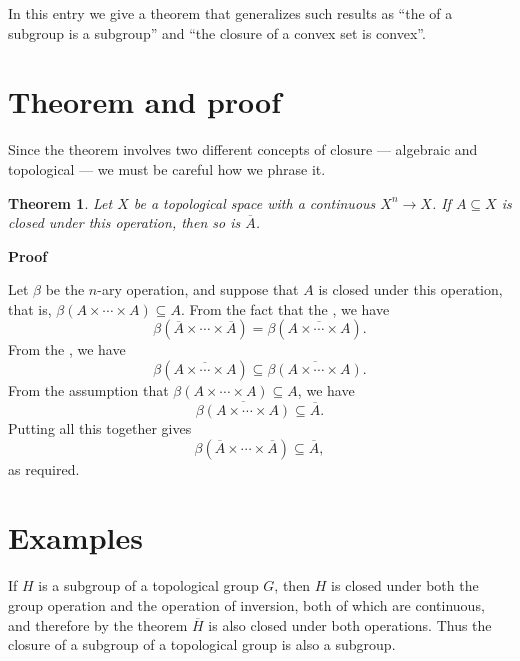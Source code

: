 \documentclass[12pt]{article}
\def\closure{\overline}
\newtheorem*{thm*}{Theorem}
\begin{document}

In this entry we give a theorem that generalizes such results as
``the  of a subgroup is a subgroup''
and ``the closure of a convex set is convex''.

\section*{Theorem and proof}

Since the theorem involves two different concepts of closure 
--- algebraic and topological --- we must be careful how we phrase it.

\begin{thm*}
Let $X$ be a topological space with a continuous
 $X^n\to X$.
If $A\subseteq X$ is closed under this operation,
then so is $\closure{A}$.
\end{thm*}

{\bf Proof}

Let $\beta$ be the $n$-ary operation,
and suppose that $A$ is closed under this operation,
that is, $\beta(A\times\cdots\times A)\subseteq A$.
From the fact that the 
,
we have
\[
  \beta(\closure{A}\times\cdots\times\closure{A}) =
  \beta(\closure{A\times\cdots\times A}).
\]
From the
,
we have
\[
  \beta(\closure{A\times\cdots\times A}) \subseteq
  \closure{\beta(A\times\cdots\times A)}.
\]
From the assumption that $\beta(A\times\cdots\times A)\subseteq A$,
we have
\[
  \closure{\beta(A\times\cdots\times A)} \subseteq \closure{A}.
\]
Putting all this together gives
\[
  \beta(\closure{A}\times\cdots\times\closure{A}) \subseteq \closure{A},
\]
as required.

\section*{Examples}

If $H$ is a subgroup of a topological group $G$,
then $H$ is closed under both the group operation
and the operation of inversion,
both of which are continuous,
and therefore by the theorem $\closure{H}$
is also closed under both operations.
Thus the closure of a subgroup of a topological group is also a subgroup.
\end{document}
